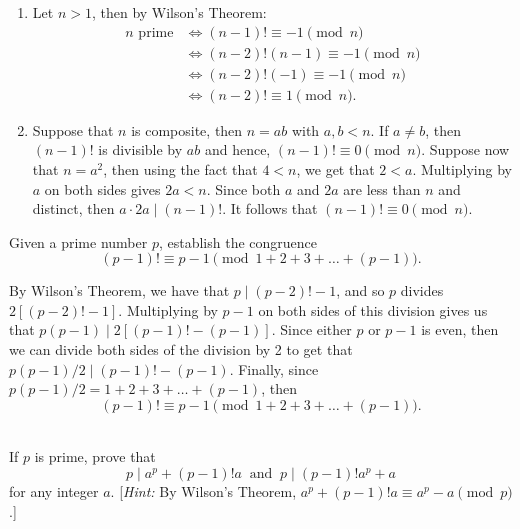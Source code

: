 \begin{solution}
    \begin{enumerate}
        \item Let $n > 1$, then by Wilson's Theorem:
        \begin{align*}
            n \text{ prime} &\iff (n-1)! \equiv -1 \pmod n \\
            &\iff (n-2)!(n-1) \equiv -1 \pmod n \\
            &\iff (n-2)!(-1) \equiv -1 \pmod n \\
            &\iff (n-2)! \equiv 1 \pmod n.
        \end{align*}
        \item Suppose that $n$ is composite, then $n = ab$ with $a,b < n$. If $a \neq b$, then $(n-1)!$ is divisible by $ab$ and hence, $(n-1)! \equiv 0 \pmod n$. Suppose now that $n = a^2$, then using the fact that $4 < n$, we get that $2 < a$. Multiplying by $a$ on both sides gives $2a < n$. Since both $a$ and $2a$ are less than $n$ and distinct, then $a\cdot 2a \mid (n-1)!$. It follows that $(n-1)! \equiv 0 \pmod n$. \\
    \end{enumerate}
\end{solution}

\begin{exercise}
    Given a prime number $p$, establish the congruence
    $$(p-1)! \equiv p-1 \pmod{1 + 2 + 3 + \dots + (p-1)}.$$ 
\end{exercise}

\begin{solution}
    By Wilson's Theorem, we have that $p \mid (p-2)! - 1$, and so $p$ divides $2[(p-2)! - 1]$. Multiplying by $p-1$ on both sides of this division gives us that $p(p-1) \mid 2[(p-1)! - (p-1)]$. Since either $p$ or $p-1$ is even, then we can divide both sides of the division by 2 to get that $p(p-1)/2 \mid (p-1)! - (p-1)$. Finally, since $p(p-1)/2 = 1 + 2 + 3 + \dots + (p-1)$, then
    $$(p-1)! \equiv p-1 \pmod{1 + 2 + 3 + \dots + (p-1)}.$$\\
\end{solution}

\begin{exercise}
    If $p$ is prime, prove that
    $$p \mid a^p + (p-1)!a \ \text{ and } \ p \mid (p-1)!a^p + a$$
    for any integer $a$. [\textit{Hint:} By Wilson's Theorem, $a^p + (p-1)!a \equiv a^p -a \pmod p$.] \\
\end{exercise}


